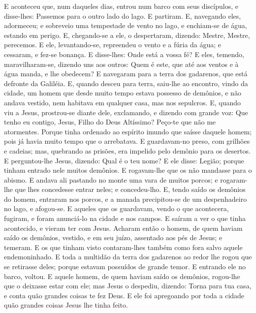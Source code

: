 E aconteceu que, num daqueles dias, entrou num barco com seus
discípulos, e disse-lhes: Passemos para o outro lado do lago. E
partiram. E, navegando eles, adormeceu; e sobreveio uma
tempestade de vento no lago, e enchiam-se de água, estando em
perigo. E, chegando-se a ele, o despertaram, dizendo: Mestre,
Mestre, perecemos. E ele, levantando-se, repreendeu o vento e a
fúria da água; e cessaram, e fez-se bonança. E disse-lhes:
Onde está a vossa fé? E eles, temendo, maravilharam-se, dizendo uns
aos outros: Quem é este, que até aos ventos e à água manda, e lhe
obedecem? E navegaram para a terra dos gadarenos, que está
defronte da Galiléia. E, quando desceu para terra, saiu-lhe
ao encontro, vindo da cidade, um homem que desde muito tempo estava
possesso de demônios, e não andava vestido, nem habitava em qualquer
casa, mas nos sepulcros. E, quando viu a Jesus, prostrou-se
diante dele, exclamando, e dizendo com grande voz: Que tenho eu
contigo, Jesus, Filho do Deus Altíssimo? Peço-te que não me
atormentes. Porque tinha ordenado ao espírito imundo que
saísse daquele homem; pois já havia muito tempo que o arrebatava. E
guardavam-no preso, com grilhões e cadeias; mas, quebrando as
prisões, era impelido pelo demônio para os desertos. E
perguntou-lhe Jesus, dizendo: Qual é o teu nome? E ele disse:
Legião; porque tinham entrado nele muitos demônios. E
rogavam-lhe que os não mandasse para o abismo. E andava ali
pastando no monte uma vara de muitos porcos; e rogaram-lhe que lhes
concedesse entrar neles; e concedeu-lho. E, tendo saído os
demônios do homem, entraram nos porcos, e a manada precipitou-se de
um despenhadeiro no lago, e afogou-se. E aqueles que os
guardavam, vendo o que acontecera, fugiram, e foram anunciá-lo na
cidade e nos campos. E saíram a ver o que tinha acontecido, e
vieram ter com Jesus. Acharam então o homem, de quem haviam saído os
demônios, vestido, e em seu juízo, assentado aos pés de Jesus; e
temeram. E os que tinham visto contaram-lhes também como fora
salvo aquele endemoninhado. E toda a multidão da terra dos
gadarenos ao redor lhe rogou que se retirasse deles; porque estavam
possuídos de grande temor. E entrando ele no barco, voltou. E
aquele homem, de quem haviam saído os demônios, rogou-lhe que o
deixasse estar com ele; mas Jesus o despediu, dizendo: Torna
para tua casa, e conta quão grandes coisas te fez Deus. E ele foi
apregoando por toda a cidade quão grandes coisas Jesus lhe tinha
feito.

